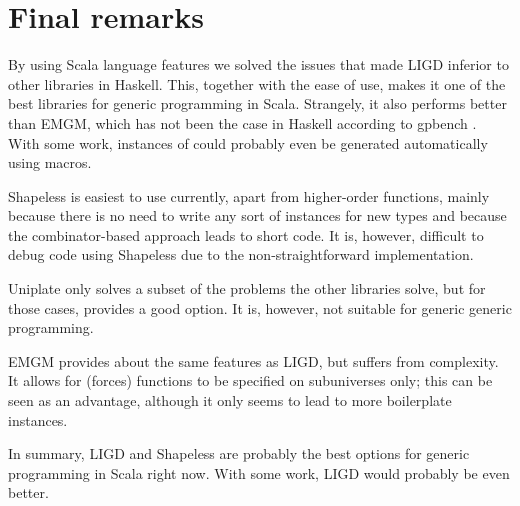 \section{Final remarks}
By using Scala language features we solved the issues that made LIGD inferior to
other libraries in Haskell. This, together with the ease of use, makes it one
of the best libraries for generic programming in Scala. Strangely, it also
performs better than EMGM, which has not been the case in Haskell according
to gpbench \cite{DBLP:conf/haskell/RodriguezJJGKO08}. With some work, instances
of  could probably even be generated automatically using macros. 

Shapeless is easiest to use currently, apart from higher-order functions,
mainly because there is no need to write any sort of instances for new types
and because the combinator-based approach leads to short code. It is, however,
difficult to debug code using Shapeless due to the non-straightforward
implementation.

Uniplate only solves a subset of the problems the other libraries solve, but
for those cases, provides a good option. It is, however, not suitable for
generic generic programming.

EMGM provides about the same features as LIGD, but suffers from complexity. It
allows for (forces) functions to be specified on subuniverses only; this can be
seen as an advantage, although it only seems to lead to more boilerplate instances.

In summary, LIGD and Shapeless are probably the best options for generic
programming in Scala right now. With some work, LIGD would probably be even
better.
